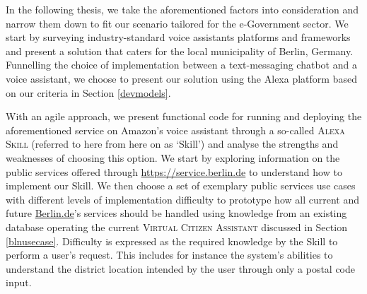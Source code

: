 In the following thesis, we take the aforementioned factors into consideration and narrow them down to fit our scenario tailored for the e-Government sector. We start by surveying industry-standard %
voice assistants platforms 
and frameworks
and present a solution that caters for the local municipality of Berlin, Germany.
Funnelling the choice of implementation between a text-messaging chatbot and a voice assistant, we choose to present our solution using the Alexa platform based on our criteria in Section \ref{devmodels}.

With an agile approach, we present functional code for running and deploying the aforementioned service on Amazon's voice assistant through a so-called \textsc{Alexa Skill} (referred to here from here on as `Skill') and analyse the strengths and weaknesses of choosing this option. We start by exploring information on the public services offered through \href{https://service.berlin.de}{https://service.berlin.de} 
to understand how to implement our Skill. 
We then choose a set of exemplary public services use cases with different levels of implementation difficulty to prototype how all current and future \href{https://service.berlin.de}{Berlin.de}'s 
services should be handled using knowledge from an existing database operating the current \textsc{Virtual Citizen Assistant} discussed in Section \ref{blnusecase}.
Difficulty is expressed as the required knowledge by the Skill to perform a user's request. This includes for instance the system's abilities to understand the district location intended by the user through only a postal code input.

